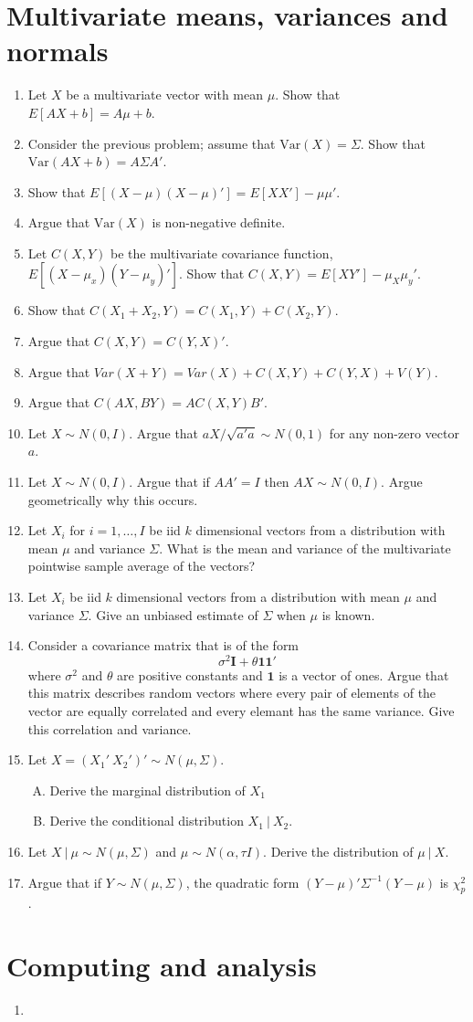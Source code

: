 \documentclass[12pt]{article}
\begin{document}
\section{Multivariate means, variances and normals}
\begin{enumerate}[1.]
\item Let $X$ be a multivariate vector with mean $\mu$. Show that $E[AX + b] = A\mu + b$.
\item Consider the previous problem; assume that $\mbox{Var}(X) = \Sigma$. Show that $\mbox{Var}(AX + b) = A\Sigma A'$.
\item Show that $E[(X - \mu)(X - \mu)'] = E[XX'] - \mu\mu'$.
\item Argue that $\mbox{Var}(X)$ is non-negative definite.
\item Let $C(X, Y)$ be the multivariate covariance function, $E[(X - \mu_x) (Y - \mu_y)']$.
  Show that $C(X, Y) = E[XY'] - \mu_X\mu_y'$. 
\item Show that $C(X_1 + X_2, Y) = C(X_1, Y) + C(X_2, Y)$.
\item Argue that $C(X, Y) = C(Y, X)'$. 
\item Argue that $Var(X + Y) = Var(X) + C(X, Y) + C(Y, X) + V(Y)$.
\item Argue that $C(AX, BY) = AC(X, Y)B'$.  
\item Let $X \sim N(0, I)$. Argue that $a X / \sqrt{a'a} \sim N(0, 1)$ for any non-zero vector $a$. 
\item Let $X \sim N(0, I)$. Argue that if $AA' = I$ then $AX \sim N(0, I)$. Argue geometrically why this occurs.
\item Let $X_i$ for $i=1,\ldots, I$ be iid $k$ dimensional vectors
from a distribution with mean $\mu$ and variance $\Sigma$. 
What is the mean and variance of the multivariate pointwise sample
average of the vectors?
\item Let $X_i$ be iid $k$ dimensional vectors
from a distribution with mean $\mu$ and variance $\Sigma$.
Give an unbiased estimate of $\Sigma$ when $\mu$ is known.
\item Consider a covariance matrix that is of the form
$$
\sigma^2 \mathbf{I} + \theta \mathbf{1}\mathbf{1}'
$$	where $\sigma^2$ and $\theta$ are positive constants
and $\mathbf{1}$ is a vector of ones. Argue that this
matrix describes random vectors where every pair of elements of 
the vector are 
equally correlated and every elemant has the same variance. Give
this correlation and variance.
\item Let $X = (X_1' ~ X_2')' \sim N(\mu, \Sigma)$.
  \begin{enumerate}[A.]
  \item Derive the marginal distribution of $X_1$
  \item Derive the conditional distribution $X_1 ~|~ X_2$. 
  \end{enumerate}
\item Let $X ~|~ \mu \sim N(\mu, \Sigma)$ and $\mu \sim N(\alpha, \tau I)$. Derive the distribution of
  $\mu ~|~ X$.
 \item Argue that if $Y \sim N(\mu, \Sigma)$, the quadratic form $(Y - \mu)'\Sigma^{-1}(Y - \mu)$ is $\chi^2_p$. 
\end{enumerate}


\section{Computing and analysis}
\begin{enumerate}[1.]
\item 
\end{enumerate}
\end{document}
